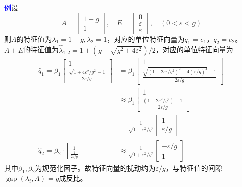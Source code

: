 \documentclass[12pt,a4paper]{article}
\begin{document}
\textcolor{blue}{例}\quad 设$$
A=\left[\begin{array}{c}{1+g} \\ {1}\end{array}\right], \quad E=\left[\begin{array}{c}{0} \\ {\varepsilon} \\ {\varepsilon}\end{array}\right], \quad(0<\varepsilon<g)
$$
则$A$的特征值为$\lambda_{1}=1+g, \lambda_{2}=1$，对应的单位特征向量为$q_{1}=e_{1}，q_{2}=e_{2}$。$A+E$的特征值为$\hat{\lambda}_{1,2}=1+\left(g \pm \sqrt{g^{2}+4 \varepsilon^{2}}\right) / 2$，对应的单位特征向量为$$
\begin{aligned} \hat{q}_{1}
=\beta_{1} \left[\begin{array}{c}{1} \\ {\frac{\sqrt{1+4 \varepsilon^{2} / g^{2}}-1}{2 \varepsilon / g}}\end{array}\right]
 &=\beta_{1} \left[\begin{array}{c}{1} \\ {\frac{\sqrt{\left(1+2 \varepsilon^{2} / g^{2}\right)^{2}-4(\varepsilon / g)^{4}}-1}{2 \varepsilon / g}}\end{array}\right] \\
 & \approx \beta_{1} \left[\begin{array}{c}{1} \\ {\frac{\left(1+2 \varepsilon^{2} / g^{2}\right)-1}{2 \varepsilon / g}}\end{array}\right]\\
&=\frac{1}{\sqrt{1+\varepsilon^{2} / g^{2}}}\left[\begin{array}{c}{1} \\ {\varepsilon / g}\end{array}\right]\\
\hat{q}_{2}=\beta_{2} \cdot\left[\frac{1}{\frac{1}{2 \varepsilon / g}}\right] &\approx \frac{1}{\sqrt{1+\varepsilon^{2} / g^{2}}}\left[\begin{array}{c}{-\varepsilon / g} \\ {1}\end{array}\right]\end{aligned}
$$
其中$\beta_1,\beta_2$为规范化因子。故特征向量的扰动约为$\varepsilon / g$，与特征值的间隙$\operatorname{gap}\left(\lambda_{i}, A\right)=g$成反比。
\end{document}
